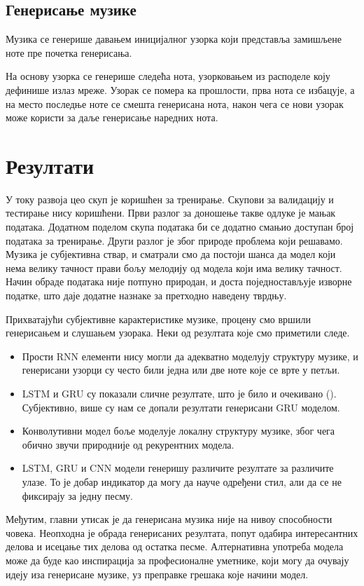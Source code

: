 \documentclass[11pt]{article}
\begin{document}
\subsection{Генерисање музике}
\label{sec:org9f53bbc}
Музика се генерише давањем иницијалног узорка који представља замишљене ноте пре почетка генерисања.

На основу узорка се генерише следећа нота, узорковањем из расподеле коју дефинише излаз мреже. Узорак се помера ка прошлости, прва нота се избацује, а на место последње ноте се смешта генерисана нота, након чега се нови узорак може користи за даље генерисање наредних нота.

\section{Резултати}
\label{sec:orgfd96aa2}
У току развоја цео скуп је коришћен за тренирање. Скупови за валидацију и тестирање нису коришћени. Први разлог за доношење такве одлуке је мањак података. Додатном поделом скупа података би се додатно смањио доступан број података за тренирање. Други разлог је због природе проблема који решавамо. Музика је субјективна ствар, и сматрали смо да постоји шанса да модел који нема велику тачност прави бољу мелодију од модела који има велику тачност. Начин обраде података није потпуно природан, и доста поједностављује изворне податке, што даје додатне назнаке за претходно наведену тврдњу.

Прихватајући субјективне карактеристике музике, процену смо вршили генерисањем и слушањем узорака. Неки од резултата које смо приметили следе.

\begin{itemize}
\item Прости RNN елементи нису могли да адекватно моделују структуру музике, и генерисани узорци су често били једна или две ноте које се врте у петљи.
\item LSTM и GRU су показали сличне резултате, што је било и очекивано (\cite{chung_empirical_2014}). Субјективно, више су нам се допали резултати генерисани GRU моделом.
\item Конволутивни модел боље моделује локалну структуру музике, због чега обично звучи природније од рекурентних модела.
\item LSTM, GRU и CNN модели генеришу различите резултате за различите улазе. То је добар индикатор да могу да науче одређени стил, али да се не фиксирају за једну песму.
\end{itemize}

Међутим, главни утисак је да генерисана музика није на нивоу способности човека. Неопходна је обрада генерисаних резултата, попут одабира интересантних делова и исецање тих делова од остатка песме. Алтернативна употреба модела може да буде као инспирација за професионалне уметнике, који могу да очувају идеју иза генерисане музике, уз преправке грешака које начини модел.

\printbibliography
\end{document}
